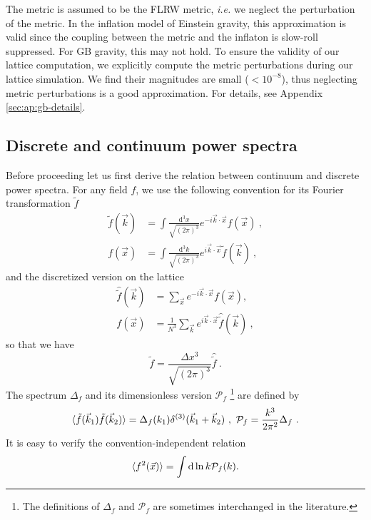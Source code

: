 \documentclass[reprint, 10pt, amsmath, amssymb, floatfix, aps, prd, superscriptaddress, nofootinbib, nobibnotes,twocolumn]{revtex4-1}
\def\dd{{\mathrm{d}}}
\begin{document}
The metric is assumed to be the FLRW metric, \textit{i.e.} we neglect the perturbation of the metric. In the inflation model of Einstein gravity, this approximation is valid since the coupling between the metric and the inflaton is slow-roll suppressed. For GB gravity, this may not hold. To ensure the validity of our lattice computation, we explicitly compute the metric perturbations during our lattice simulation. We find their magnitudes are small ($< 10^{-8}$), thus neglecting metric perturbations is a good approximation. For details, see Appendix \ref{sec:ap:gb-details}.

\subsection{Discrete and continuum power spectra}
Before proceeding let us first derive the relation between continuum and discrete power spectra. For any field $f$, we use the following convention for its Fourier transformation $\tilde f$
\begin{align}
	\tilde f(\vec k) & = \int\frac{\dd^3x}{\sqrt{(2\pi)^3}} e^{-i\vec k\cdot\vec x}f(\vec x) \ ,\\
	f(\vec x) & = \int\frac{\dd^3k}{\sqrt{(2\pi)^3}} e^{i\vec k\cdot\vec x}\tilde f(\vec k) \ ,
\end{align}
and the discretized version on the lattice
\begin{align}
	\hat{\tilde f}(\vec k) & = \sum_{\vec x} e^{-i\vec k\cdot\vec x}f(\vec x),\\
	f(\vec x) & = \frac{1}{N^3}\sum_{\vec k} e^{i\vec k\cdot\vec x}\hat{\tilde f}(\vec k) \ ,
\end{align}
so that we have
\begin{equation}\label{eq:f-hat-f-relation}
    \tilde f = \frac{\Delta x^3}{\sqrt{(2\pi)^3}}\hat{\tilde f} \ .
\end{equation}
The spectrum $\Delta_f$ and its dimensionless version $\mathcal P_f$ \footnote{The definitions of $\Delta_f$ and $\mathcal P_f$ are sometimes interchanged in the literature.} are defined by
\begin{equation}
	\braket{\tilde f(\vec k_1)\tilde f(\vec k_2)} = \Delta_f(k_1) \delta^{(3)}(\vec k_1 + \vec k_2) \ , \ \mathcal P_f = \frac{k^3}{2\pi^2}\Delta_f \ .
\end{equation}
It is easy to verify the convention-independent relation
\begin{equation}
	\braket{f^2(\vec x)} = \int\dd\ln k \mathcal P_f(k).
\end{equation}
\end{document}
